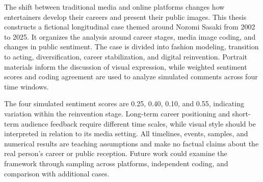 The shift between traditional media and online platforms changes how entertainers develop their careers and present their public images. This thesis constructs a fictional longitudinal case themed around Nozomi Sasaki from 2002 to 2025. It organizes the analysis around career stages, media image coding, and changes in public sentiment. The case is divided into fashion modeling, transition to acting, diversification, career stabilization, and digital reinvention. Portrait materials inform the discussion of visual expression, while weighted sentiment scores and coding agreement are used to analyze simulated comments across four time windows.

The four simulated sentiment scores are 0.25, 0.40, 0.10, and 0.55, indicating variation within the reinvention stage. Long-term career positioning and short-term audience feedback require different time scales, while visual style should be interpreted in relation to its media setting. All timelines, events, samples, and numerical results are teaching assumptions and make no factual claims about the real person's career or public reception. Future work could examine the framework through sampling across platforms, independent coding, and comparison with additional cases.
